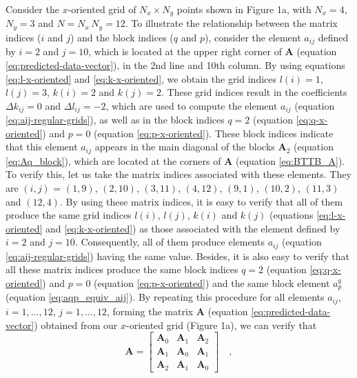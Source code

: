 Consider the $x$-oriented grid of $N_{x} \times N_{y}$ points shown in Figure 1a, 
with $N_{x} = 4$, $N_{y} = 3$ and $N = N_{x} \, N_{y} = 12$.
To illustrate the relationship between the matrix indices ($i$ and $j$) and 
the block indices ($q$ and $p$), consider the element $a_{ij}$ defined by 
$i = 2$ and $j = 10$, which is
located at the upper right corner of $\mathbf{A}$ (equation \ref{eq:predicted-data-vector}), 
in the 2nd line and 10th column.
By using equations \ref{eq:l-x-oriented} and \ref{eq:k-x-oriented}, we obtain the 
grid indices $l(i) = 1$, $l(j) = 3$, $k(i) = 2$ and $k(j) = 2$.
These grid indices result in the coefficients $\Delta k_{ij} = 0$ and $\Delta l_{ij} = -2$,
which are used to compute the element $a_{ij}$ (equation \ref{eq:aij-regular-grids}),
as well as in the block indices $q = 2$ (equation \ref{eq:q-x-oriented}) and 
$p = 0$ (equation \ref{eq:p-x-oriented}).
These block indices indicate that this element $a_{ij}$ appears in the main diagonal
of the blocks $\mathbf{A}_{2}$ (equation \ref{eq:Aq_block}), which are located at the corners 
of $\mathbf{A}$ (equation \ref{eq:BTTB_A}).
To verify this, let us take the matrix indices associated with these elements.
They are $(i, j)$ = $(1, 9)$, $(2, 10)$, $(3, 11)$, $(4, 12)$, $(9, 1)$, $(10, 2)$, 
$(11, 3)$ and $(12, 4)$. By using these matrix indices, it is easy to verify that all
of them produce the same grid indices $l(i)$, $l(j)$, $k(i)$ and $k(j)$ 
(equations \ref{eq:l-x-oriented} and \ref{eq:k-x-oriented}) as those associated with
the element defined by $i = 2$ and $j = 10$. Consequently, all of them produce
elements $a_{ij}$ (equation \ref{eq:aij-regular-grids}) having the same value.
Besides, it is also easy to verify that all these matrix indices produce the same block
indices $q = 2$ (equation \ref{eq:q-x-oriented}) and $p = 0$ (equation \ref{eq:p-x-oriented})
and the same block element $a^{q}_{p}$ (equation \ref{eq:aqp_equiv_aij}).
By repeating this procedure for all elements $a_{ij}$, $i = 1, \dots, 12$, $j = 1, \dots, 12$, 
forming the matrix $\mathbf{A}$ (equation \ref{eq:predicted-data-vector}) obtained from our 
$x$-oriented grid (Figure 1a), we can verify that
\begin{equation}
\mathbf{A} = \begin{bmatrix}
\mathbf{A}_{0} & \mathbf{A}_{1} & \mathbf{A}_{2} \\
\mathbf{A}_{1} & \mathbf{A}_{0} & \mathbf{A}_{1} \\
\mathbf{A}_{2} & \mathbf{A}_{1} & \mathbf{A}_{0}
\end{bmatrix} \quad ,
\label{eq:A-x-oriented-example}
\end{equation}
